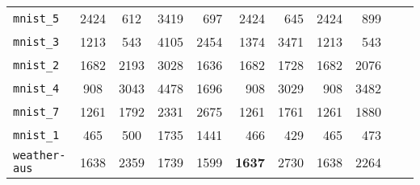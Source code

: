 \begin{tabular}{lccrrrrrrrr}
\texttt{mnist\_5} & 2424 & 612 & 3419 & 697 & 2424 & 645 & 2424 & 899\\
\texttt{mnist\_3} & 1213 & 543 & 4105 & 2454 & 1374 & 3471 & 1213 & 543\\
\texttt{mnist\_2} & 1682 & 2193 & 3028 & 1636 & 1682 & 1728 & 1682 & 2076\\
\texttt{mnist\_4} & 908 & 3043 & 4478 & 1696 & 908 & 3029 & 908 & 3482\\
\texttt{mnist\_7} & 1261 & 1792 & 2331 & 2675 & 1261 & 1761 & 1261 & 1880\\
\texttt{mnist\_1} & 465 & 500 & 1735 & 1441 & 466 & 429 & 465 & 473\\
\texttt{weather-aus} & 1638 & 2359 & 1739 & 1599 & \textbf{1637} & 2730 & 1638 & 2264\\
\bottomrule
\end{tabular}
